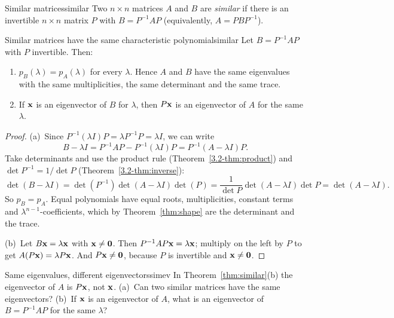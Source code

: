 \documentclass[11pt]{article}
\begin{document}
\begin{defn}{Similar matrices}{similar}
Two $n\times n$ matrices $A$ and $B$ are \emph{similar} if there is an invertible $n\times n$ matrix $P$ with $B=P^{-1}AP$ (equivalently, $A=PBP^{-1}$).
\end{defn}

\begin{thm}{Similar matrices have the same characteristic polynomial}{similar}
Let $B=P^{-1}AP$ with $P$ invertible. Then:
\begin{enumerate}[label=(\alph*),itemsep=1pt]
  \item $p_B(\lambda)=p_A(\lambda)$ for every $\lambda$. Hence $A$ and $B$ have the same eigenvalues with the same multiplicities, the same determinant and the same trace.
  \item If $\mathbf{x}$ is an eigenvector of $B$ for $\lambda$, then $P\mathbf{x}$ is an eigenvector of $A$ for the same $\lambda$.
\end{enumerate}
\end{thm}

\begin{proof}
(a)~Since $P^{-1}(\lambda I)P=\lambda P^{-1}P=\lambda I$, we can write
\[
B-\lambda I=P^{-1}AP-P^{-1}(\lambda I)P=P^{-1}(A-\lambda I)P.
\]
Take determinants and use the product rule (Theorem~\ref{3.2-thm:product}) and $\det P^{-1}=1/\det P$ (Theorem~\ref{3.2-thm:inverse}):
\[
\det(B-\lambda I)=\det(P^{-1})\det(A-\lambda I)\det(P)=\frac{1}{\det P}\det(A-\lambda I)\det P=\det(A-\lambda I).
\]
So $p_B=p_A$. Equal polynomials have equal roots, multiplicities, constant terms and $\lambda^{n-1}$-coefficients, which by Theorem~\ref{thm:shape} are the determinant and the trace.

(b)~Let $B\mathbf{x}=\lambda\mathbf{x}$ with $\mathbf{x}\neq\mathbf{0}$. Then $P^{-1}AP\mathbf{x}=\lambda\mathbf{x}$; multiply on the left by $P$ to get $A(P\mathbf{x})=\lambda P\mathbf{x}$. And $P\mathbf{x}\neq\mathbf{0}$, because $P$ is invertible and $\mathbf{x}\neq\mathbf{0}$.
\end{proof}

\begin{think}{Same eigenvalues, different eigenvectors}{simev}
In Theorem~\ref{thm:similar}(b) the eigenvector of $A$ is $P\mathbf{x}$, not $\mathbf{x}$. (a)~Can two similar matrices have the same eigenvectors? (b)~If $\mathbf{x}$ is an eigenvector of $A$, what is an eigenvector of $B=P^{-1}AP$ for the same $\lambda$?
\end{think}
\end{document}
